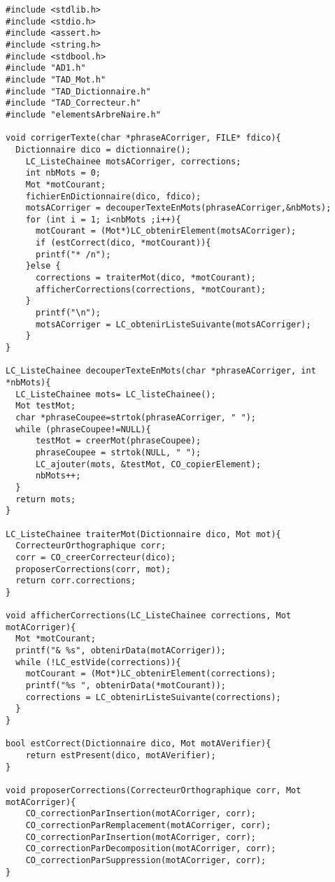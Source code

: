 \documentclass{report}
\begin{document}
 
\begin{lstlisting}
#include <stdlib.h>
#include <stdio.h>
#include <assert.h>
#include <string.h>
#include <stdbool.h>
#include "AD1.h"
#include "TAD_Mot.h"
#include "TAD_Dictionnaire.h"
#include "TAD_Correcteur.h"
#include "elementsArbreNaire.h"

void corrigerTexte(char *phraseACorriger, FILE* fdico){
  Dictionnaire dico = dictionnaire();
    LC_ListeChainee motsACorriger, corrections;
    int nbMots = 0;
    Mot *motCourant;
    fichierEnDictionnaire(dico, fdico);
    motsACorriger = decouperTexteEnMots(phraseACorriger,&nbMots);
    for (int i = 1; i<nbMots ;i++){
      motCourant = (Mot*)LC_obtenirElement(motsACorriger);
      if (estCorrect(dico, *motCourant)){
	  printf("* /n");
	}else {
	  corrections = traiterMot(dico, *motCourant);
	  afficherCorrections(corrections, *motCourant);
	}
      printf("\n");
      motsACorriger = LC_obtenirListeSuivante(motsACorriger);
    }
}

LC_ListeChainee decouperTexteEnMots(char *phraseACorriger, int *nbMots){
  LC_ListeChainee mots= LC_listeChainee();
  Mot testMot;
  char *phraseCoupee=strtok(phraseACorriger, " ");
  while (phraseCoupee!=NULL){
      testMot = creerMot(phraseCoupee);
      phraseCoupee = strtok(NULL, " ");
      LC_ajouter(mots, &testMot, CO_copierElement);
      nbMots++;
  }
  return mots;
}

LC_ListeChainee traiterMot(Dictionnaire dico, Mot mot){
  CorrecteurOrthographique corr;
  corr = CO_creerCorrecteur(dico);
  proposerCorrections(corr, mot);
  return corr.corrections;
}

void afficherCorrections(LC_ListeChainee corrections, Mot motACorriger){
  Mot *motCourant;
  printf("& %s", obtenirData(motACorriger));
  while (!LC_estVide(corrections)){
    motCourant = (Mot*)LC_obtenirElement(corrections);
    printf("%s ", obtenirData(*motCourant));
    corrections = LC_obtenirListeSuivante(corrections);
  }
}

bool estCorrect(Dictionnaire dico, Mot motAVerifier){
    return estPresent(dico, motAVerifier);
}

void proposerCorrections(CorrecteurOrthographique corr, Mot motACorriger){
    CO_correctionParInsertion(motACorriger, corr);
    CO_correctionParRemplacement(motACorriger, corr);
    CO_correctionParInsertion(motACorriger, corr);
    CO_correctionParDecomposition(motACorriger, corr);
    CO_correctionParSuppression(motACorriger, corr);
}


 





\end{lstlisting}
 
\end{document}
